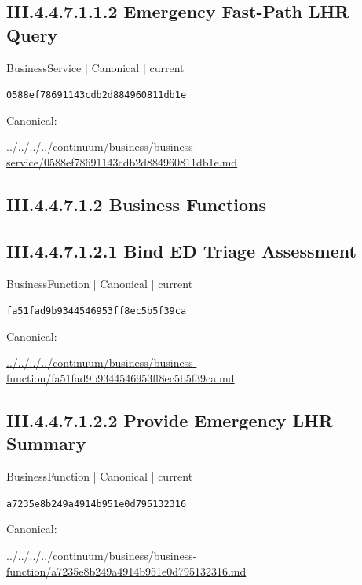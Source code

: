 \documentclass[10pt,a4paper]{article}
\begin{document}
\subsection*{III.4.4.7.1.1.2 Emergency Fast-Path LHR Query}
\label{element-0588ef78691143cdb2d884960811db1e}
{\small BusinessService | Canonical | current}\par
\texttt{0588ef78691143cdb2d884960811db1e}\par
Canonical: \par
{\footnotesize\url{../../../../continuum/business/business-service/0588ef78691143cdb2d884960811db1e.md}}\par
\subsection*{III.4.4.7.1.2 Business Functions}
\subsection*{III.4.4.7.1.2.1 Bind ED Triage Assessment}
\label{element-fa51fad9b9344546953ff8ec5b5f39ca}
{\small BusinessFunction | Canonical | current}\par
\texttt{fa51fad9b9344546953ff8ec5b5f39ca}\par
Canonical: \par
{\footnotesize\url{../../../../continuum/business/business-function/fa51fad9b9344546953ff8ec5b5f39ca.md}}\par
\subsection*{III.4.4.7.1.2.2 Provide Emergency LHR Summary}
\label{element-a7235e8b249a4914b951e0d795132316}
{\small BusinessFunction | Canonical | current}\par
\texttt{a7235e8b249a4914b951e0d795132316}\par
Canonical: \par
{\footnotesize\url{../../../../continuum/business/business-function/a7235e8b249a4914b951e0d795132316.md}}\par
\end{document}
